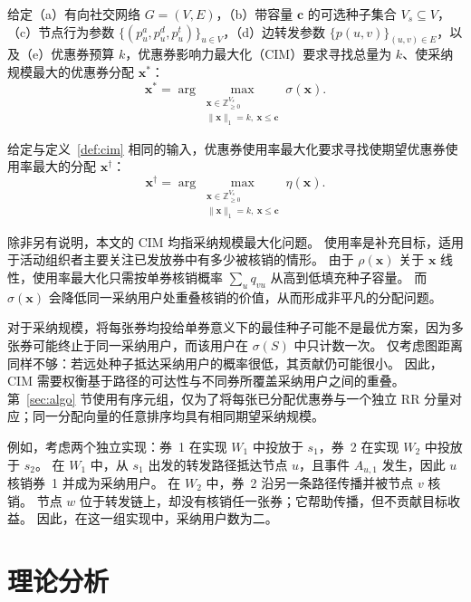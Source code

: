 \documentclass[sigconf,balance=false]{acmart}
\begin{document}
\begin{definition}
\label{def:cim}
给定（a）有向社交网络 $G=(V,E)$，（b）带容量 $\bm{c}$ 的可选种子集合 $V_s\subseteq V$，（c）节点行为参数 $\{(p_u^a,p_u^d,p_u^t)\}_{u\in V}$，（d）边转发参数 $\{p(u,v)\}_{(u,v)\in E}$，以及（e）优惠券预算 $k$，优惠券影响力最大化（CIM）要求寻找总量为 $k$、使采纳规模最大的优惠券分配 $\bm{x}^*$：
\[
  \bm{x}^*=\arg\max_{\substack{\bm{x}\in\mathbb{Z}_{\geq0}^{V_s}\\
  \|\bm{x}\|_1=k,\ \bm{x}\leq\bm{c}}}\sigma(\bm{x}).
\]
\end{definition}

\begin{definition}[优惠券使用率最大化]
\label{def:usage-rate}
给定与定义~\ref{def:cim} 相同的输入，优惠券使用率最大化要求寻找使期望优惠券使用率最大的分配 $\bm{x}^\dagger$：
\[
  \bm{x}^\dagger =
  \arg\max_{\substack{\bm{x}\in\mathbb{Z}_{\geq0}^{V_s}\\
  \|\bm{x}\|_1=k,\ \bm{x}\leq\bm{c}}}
  \eta(\bm{x}).
\]
\end{definition}

除非另有说明，本文的 CIM 均指采纳规模最大化问题。
使用率是补充目标，适用于活动组织者主要关注已发放券中有多少被核销的情形。
由于 $\rho(\bm{x})$ 关于 $\bm{x}$ 线性，使用率最大化只需按单券核销概率 $\sum_u q_{vu}$ 从高到低填充种子容量。
而 $\sigma(\bm{x})$ 会降低同一采纳用户处重叠核销的价值，从而形成非平凡的分配问题。

对于采纳规模，将每张券均投给单券意义下的最佳种子可能不是最优方案，因为多张券可能终止于同一采纳用户，而该用户在 $\sigma(S)$ 中只计数一次。
仅考虑图距离同样不够：若远处种子抵达采纳用户的概率很低，其贡献仍可能很小。
因此，CIM 需要权衡基于路径的可达性与不同券所覆盖采纳用户之间的重叠。
第~\ref{sec:algo} 节使用有序元组，仅为了将每张已分配优惠券与一个独立 RR 分量对应；同一分配向量的任意排序均具有相同期望采纳规模。

例如，考虑两个独立实现：券~1 在实现 $W_1$ 中投放于 $s_1$，券~2 在实现 $W_2$ 中投放于 $s_2$。
在 $W_1$ 中，从 $s_1$ 出发的转发路径抵达节点 $u$，且事件 $A_{u,1}$ 发生，因此 $u$ 核销券~1 并成为采纳用户。
在 $W_2$ 中，券~2 沿另一条路径传播并被节点 $v$ 核销。
节点 $w$ 位于转发链上，却没有核销任一张券；它帮助传播，但不贡献目标收益。
因此，在这一组实现中，采纳用户数为二。

\section{理论分析}
\label{sec:theory}
\end{document}
